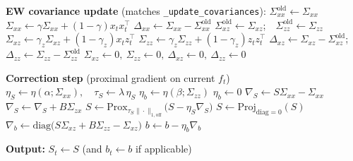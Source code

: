 \begin{algorithm}[t]
\begin{algorithmic}[1]
  \State \textbf{EW covariance update} (matches \texttt{\_update\_covariances}):
  \State $\Sigma_{xx}^{\text{old}} \gets \Sigma_{xx}$
  \State $\Sigma_{xx} \gets \gamma\Sigma_{xx} + (1-\gamma)x_tx_t^\top$
  \State $\Delta_{xx} \gets \Sigma_{xx} - \Sigma_{xx}^{\text{old}}$
    \State $\Sigma_{xz}^{\text{old}} \gets \Sigma_{xz}$;\ \ $\Sigma_{zz}^{\text{old}} \gets \Sigma_{zz}$
    \State $\Sigma_{xz} \gets \gamma_z\Sigma_{xz} + (1-\gamma_z)x_tz_t^\top$
    \State $\Sigma_{zz} \gets \gamma_z\Sigma_{zz} + (1-\gamma_z)z_tz_t^\top$
    \State $\Delta_{xz} \gets \Sigma_{xz} - \Sigma_{xz}^{\text{old}}$;\ \ $\Delta_{zz} \gets \Sigma_{zz} - \Sigma_{zz}^{\text{old}}$
  \Else
    \State $\Sigma_{xz}\gets 0,\ \Sigma_{zz}\gets 0,\ \Delta_{xz}\gets 0,\ \Delta_{zz}\gets 0$
  \EndIf

  \State \textbf{Correction step} (proximal gradient on current $f_t$)
  \State $\eta_S \gets \eta(\alpha;\Sigma_{xx}),\quad \tau_S \gets \lambda\,\eta_S$
    \State $\eta_b \gets \eta(\beta;\Sigma_{zz})$
  \Else
    \State $\eta_b \gets 0$
  \EndIf
    \State $\nabla_S \gets S\Sigma_{xx}-\Sigma_{xx}$
      \State $\nabla_S \gets \nabla_S + B\Sigma_{zx}$
    \EndIf
    \State $S \gets \mathrm{Prox}_{\tau_S\|\cdot\|_{1,\mathrm{off}}}\!\big(S - \eta_S\nabla_S\big)$
    \State $S \gets \mathrm{Proj}_{\mathrm{diag}=0}(S)$
      \State $\nabla_b \gets \mathrm{diag}\!\Big(S\Sigma_{xz} + B\Sigma_{zz} - \Sigma_{xz}\Big)$
      \State $b \gets b - \eta_b\nabla_b$
    \EndIf
  \EndFor

  \State \textbf{Output:} $S_t \gets S$ (and $b_t \gets b$ if applicable)
\EndFor
\end{algorithmic}
\end{algorithm}
